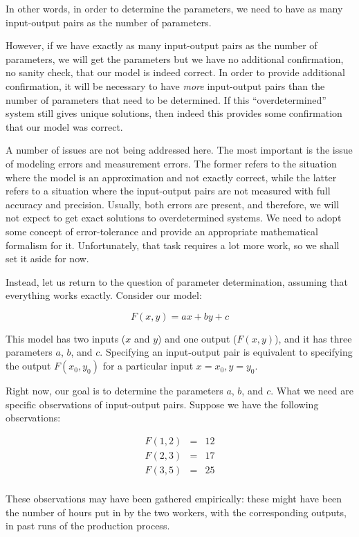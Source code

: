 \documentclass[10pt]{amsart}
\begin{document}
In other words, in order to determine the parameters, we need to have
as many input-output pairs as the number of parameters.

However, if we have exactly as many input-output pairs as the number
of parameters, we will get the parameters but we have no additional
confirmation, no sanity check, that our model is indeed correct. In
order to provide additional confirmation, it will be necessary to have
{\em more} input-output pairs than the number of parameters that need
to be determined. If this ``overdetermined'' system still gives unique
solutions, then indeed this provides some confirmation that our model
was correct.

A number of issues are not being addressed here. The most important is
the issue of modeling errors and measurement errors. The former refers
to the situation where the model is an approximation and not exactly
correct, while the latter refers to a situation where the input-output
pairs are not measured with full accuracy and precision. Usually, both
errors are present, and therefore, we will not expect to get exact
solutions to overdetermined systems. We need to adopt some concept of
error-tolerance and provide an appropriate mathematical formalism for
it. Unfortunately, that task requires a lot more work, so we shall set
it aside for now.

Instead, let us return to the question of parameter determination,
assuming that everything works exactly. Consider our model:

$$F(x,y) = ax + by + c$$

This model has two inputs ($x$ and $y$) and one output ($F(x,y)$), and
it has three parameters $a$, $b$, and $c$. Specifying an input-output
pair is equivalent to specifying the output $F(x_0,y_0)$ for a
particular input $x = x_0, y = y_0$.

Right now, our goal is to determine the parameters $a$, $b$, and
$c$. What we need are specific observations of input-output
pairs. Suppose we have the following observations:

\begin{eqnarray*}
  F(1,2) & = & 12 \\
  F(2,3) & = & 17 \\
  F(3,5) & = & 25 \\
\end{eqnarray*}

These observations may have been gathered empirically: these might
have been the number of hours put in by the two workers, with the
corresponding outputs, in past runs of the production process.
\end{document}
